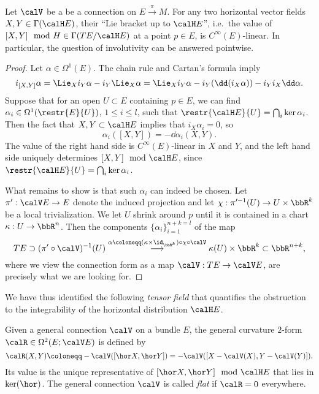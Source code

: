 \begin{prop}
    Let $\calV$ be a be a connection on $E\overset{\pi}{\to}M$. For any two horizontal vector fields $X,Y\in\Gamma(\calH E)$, their ``Lie bracket up to $\calH E$'', i.e.\ the value of $[X,Y]\mod H\in \Gamma(TE\slash \calH E)$ at a point $p\in E$, is $C^\infty(E)$-linear. In particular, the question of involutivity can be answered pointwise.
\end{prop}
\begin{proof}
    Let $\alpha\in\Omega^1(E)$. The chain rule and Cartan's formula imply
    \[i_{[X,Y]}\alpha=\Lie_Xi_Y \alpha-i_Y \Lie_X\alpha=\Lie_Xi_Y\alpha-i_Y(\dd (i_X\alpha))-i_Yi_X\dd\alpha.\]
    Suppose that for an open $U\subset E$ containing $p\in E$, we can find $\alpha_i\in\Omega^1(\restr{E}{U})$, $1\leq i\leq l$, such that $\restr{\calH E}{U}=\bigcap_i\ker\alpha_i$. Then the fact that $X,Y\subset \calH E$ implies that $i_X\alpha_i=0$, so
    \[\alpha_i([X,Y])=-\dd\alpha_i(X,Y).\]
    The value of the right hand side is $C^\infty(E)$-linear in $X$ and $Y$, and the left hand side uniquely determines $[X,Y]\mod \calH E$, since $\restr{\calH E}{U}=\bigcap_i \ker\alpha_i$. 

    What remains to show is that such $\alpha_i$ can indeed be chosen. Let $\pi':\calV E\to E$ denote the induced projection and let $\chi:\pi^{\prime-1}(U)\to U\times\bbR^k$ be a local trivialization. We let $U$ shrink around $p$ until it is contained in a chart $\kappa:U\to \bbR^n$. Then the components $\{\alpha_i\}_{i=1}^{n+k=l}$ of the map
    \[TE\supset (\pi'\circ\calV)^{-1}(U)\overset{\alpha\coloneqq (\kappa\times\id_{\bbR^k})\circ\chi\circ \calV}{\longrightarrow}\kappa(U)\times\bbR^k\subset \bbR^{n+k},\]
    where we view the connection form as a map $\calV:TE\to \calV E$, are precisely what we are looking for.
\end{proof}

We have thus identified the following \emph{tensor field} that quantifies the obstruction to the integrability of the horizontal distribution $\calH E$.

\begin{defn}
    Given a general connection $\calV$ on a bundle $E$, the general curvature $2$-form $\calR\in \Omega^2(E;\calV E)$ is defined by
    \[\calR(X,Y)\coloneqq -\calV([\hor X,\hor Y])=-\calV([X-\calV(X),Y-\calV(Y)]).\]
    Its value is the unique representative of $[\hor X,\hor Y]\mod \calH E$ that lies in $\ker(\hor)$. The general connection $\calV$ is called \emph{flat} if $\calR=0$ everywhere.
\end{defn}



